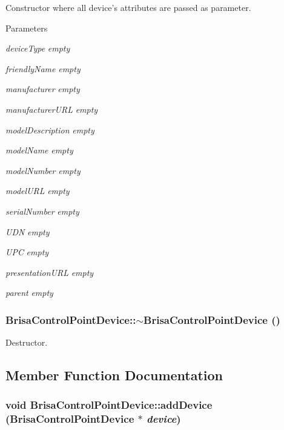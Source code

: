 Constructor where all device's attributes are passed as parameter. 
\begin{DoxyParams}{Parameters}
\item[{\em deviceType}]{\itshape empty\/} \item[{\em friendlyName}]{\itshape empty\/} \item[{\em manufacturer}]{\itshape empty\/} \item[{\em manufacturerURL}]{\itshape empty\/} \item[{\em modelDescription}]{\itshape empty\/} \item[{\em modelName}]{\itshape empty\/} \item[{\em modelNumber}]{\itshape empty\/} \item[{\em modelURL}]{\itshape empty\/} \item[{\em serialNumber}]{\itshape empty\/} \item[{\em UDN}]{\itshape empty\/} \item[{\em UPC}]{\itshape empty\/} \item[{\em presentationURL}]{\itshape empty\/} \item[{\em parent}]{\itshape empty\/} \end{DoxyParams}
\hypertarget{classBrisaUpnp_1_1BrisaControlPointDevice_a9d8a0f7c9cb57974ac8cf7ac88f82f81}{
\subsubsection[{$\sim$BrisaControlPointDevice}]{\setlength{\rightskip}{0pt plus 5cm}BrisaControlPointDevice::$\sim$BrisaControlPointDevice ()}}
\label{classBrisaUpnp_1_1BrisaControlPointDevice_a9d8a0f7c9cb57974ac8cf7ac88f82f81}


Destructor. 

\subsection{Member Function Documentation}
\hypertarget{classBrisaUpnp_1_1BrisaControlPointDevice_a37f7856e412c8450f3eba3ff6634e9a5}{
\subsubsection[{addDevice}]{\setlength{\rightskip}{0pt plus 5cm}void BrisaControlPointDevice::addDevice ({\bf BrisaControlPointDevice} $\ast$ {\em device})}}
\label{classBrisaUpnp_1_1BrisaControlPointDevice_a37f7856e412c8450f3eba3ff6634e9a5}


